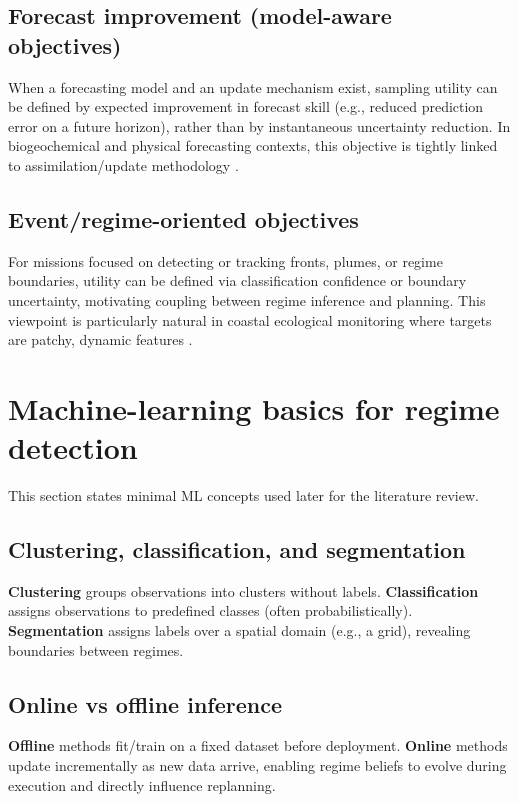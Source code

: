 \subsection{Forecast improvement (model-aware objectives)}
When a forecasting model and an update mechanism exist, sampling utility can be defined by expected improvement
in forecast skill (e.g., reduced prediction error on a future horizon), rather than by instantaneous uncertainty reduction.
In biogeochemical and physical forecasting contexts, this objective is tightly linked to assimilation/update methodology
\parencite{dowd2014dataassimilation}.

\subsection{Event/regime-oriented objectives}
For missions focused on detecting or tracking fronts, plumes, or regime boundaries, utility can be defined via
classification confidence or boundary uncertainty, motivating coupling between regime inference and planning.
This viewpoint is particularly natural in coastal ecological monitoring where targets are patchy, dynamic features
\parencite{fossum2019phytoplankton}.

\section{Machine-learning basics for regime detection} \label{sec:ml_regime_basics}

This section states minimal ML concepts used later for the literature review.

\subsection{Clustering, classification, and segmentation}
\textbf{Clustering} groups observations into clusters without labels. \textbf{Classification} assigns observations to
predefined classes (often probabilistically). \textbf{Segmentation} assigns labels over a spatial domain (e.g., a grid),
revealing boundaries between regimes.

\subsection{Online vs offline inference}
\textbf{Offline} methods fit/train on a fixed dataset before deployment. \textbf{Online} methods update incrementally as
new data arrive, enabling regime beliefs to evolve during execution and directly influence replanning.

